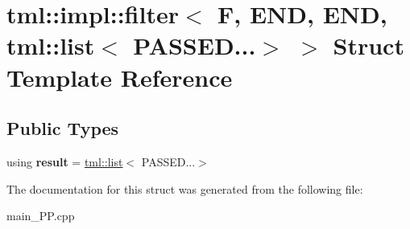 \hypertarget{structtml_1_1impl_1_1filter_3_01F_00_01END_00_01END_00_01tml_1_1list_3_01PASSED_8_8_8_4_01_4}{\section{tml\+:\+:impl\+:\+:filter$<$ F, E\+N\+D, E\+N\+D, tml\+:\+:list$<$ P\+A\+S\+S\+E\+D...$>$ $>$ Struct Template Reference}
\label{structtml_1_1impl_1_1filter_3_01F_00_01END_00_01END_00_01tml_1_1list_3_01PASSED_8_8_8_4_01_4}
}
\subsection*{Public Types}
\begin{DoxyCompactItemize}
\item 
\hypertarget{structtml_1_1impl_1_1filter_3_01F_00_01END_00_01END_00_01tml_1_1list_3_01PASSED_8_8_8_4_01_4_ac40974168a8c321e52cd11a16ab64ef3}{using {\bfseries result} = \hyperlink{structtml_1_1list}{tml\+::list}$<$ P\+A\+S\+S\+E\+D...$>$}\label{structtml_1_1impl_1_1filter_3_01F_00_01END_00_01END_00_01tml_1_1list_3_01PASSED_8_8_8_4_01_4_ac40974168a8c321e52cd11a16ab64ef3}

\end{DoxyCompactItemize}


The documentation for this struct was generated from the following file\+:\begin{DoxyCompactItemize}
\item 
main\+\_\+\+P\+P.\+cpp\end{DoxyCompactItemize}
